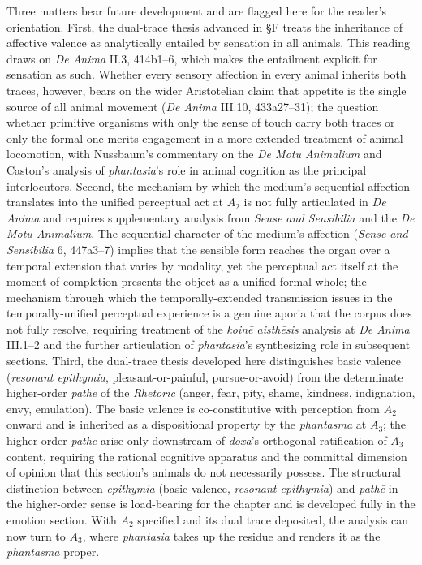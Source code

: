 Three matters bear future development and are flagged here for the reader's orientation. First, the dual-trace thesis advanced in §F treats the inheritance of affective valence as analytically entailed by sensation in all animals. This reading draws on \textit{De Anima} II.3, 414b1--6, which makes the entailment explicit for sensation as such. Whether every sensory affection in every animal inherits both traces, however, bears on the wider Aristotelian claim that appetite is the single source of all animal movement (\textit{De Anima} III.10, 433a27--31); the question whether primitive organisms with only the sense of touch carry both traces or only the formal one merits engagement in a more extended treatment of animal locomotion, with Nussbaum's commentary on the \textit{De Motu Animalium} and Caston's analysis of \textit{phantasia}'s role in animal cognition as the principal interlocutors. Second, the mechanism by which the medium's sequential affection translates into the unified perceptual act at $A_2$ is not fully articulated in \textit{De Anima} and requires supplementary analysis from \textit{Sense and Sensibilia} and the \textit{De Motu Animalium}. The sequential character of the medium's affection (\textit{Sense and Sensibilia} 6, 447a3--7) implies that the sensible form reaches the organ over a temporal extension that varies by modality, yet the perceptual act itself at the moment of completion presents the object as a unified formal whole; the mechanism through which the temporally-extended transmission issues in the temporally-unified perceptual experience is a genuine aporia that the corpus does not fully resolve, requiring treatment of the \textit{koinē aisthēsis} analysis at \textit{De Anima} III.1--2 and the further articulation of \textit{phantasia}'s synthesizing role in subsequent sections. Third, the dual-trace thesis developed here distinguishes basic valence (\textit{resonant epithymia}, pleasant-or-painful, pursue-or-avoid) from the determinate higher-order \textit{pathē} of the \textit{Rhetoric} (anger, fear, pity, shame, kindness, indignation, envy, emulation). The basic valence is co-constitutive with perception from $A_2$ onward and is inherited as a dispositional property by the \textit{phantasma} at $A_3$; the higher-order \textit{pathē} arise only downstream of \textit{doxa}'s orthogonal ratification of $A_3$ content, requiring the rational cognitive apparatus and the committal dimension of opinion that this section's animals do not necessarily possess. The structural distinction between \textit{epithymia} (basic valence, \textit{resonant epithymia}) and \textit{pathē} in the higher-order sense is load-bearing for the chapter and is developed fully in the emotion section. With $A_2$ specified and its dual trace deposited, the analysis can now turn to $A_3$, where \textit{phantasia} takes up the residue and renders it as the \textit{phantasma} proper.

